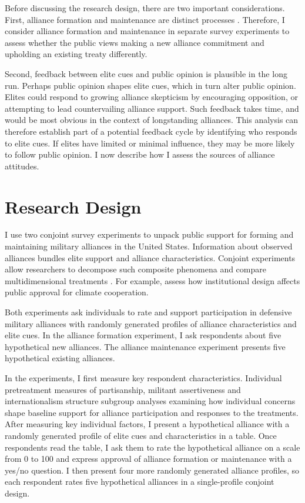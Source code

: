 \documentclass[12pt]{article}
\begin{document}
Before discussing the research design, there are two important considerations. 
First, alliance formation and maintenance are distinct processes \citep{Snyder1997}. 
Therefore, I consider alliance formation and maintenance in separate survey experiments to assess whether the public views making a new alliance commitment and upholding an existing treaty differently. 


Second, feedback between elite cues and public opinion is plausible in the long run. 
Perhaps public opinion shapes elite cues, which in turn alter public opinion. 
Elites could respond to growing alliance skepticism by encouraging opposition, or attempting to lead countervailing alliance support.
Such feedback takes time, and would be most obvious in the context of longstanding alliances.
This analysis can therefore establish part of a potential feedback cycle by identifying who responds to elite cues.  
If elites have limited or minimal influence, they may be more likely to follow public opinion.
I now describe how I assess the sources of alliance attitudes. 


\section{Research Design}


I use two conjoint survey experiments to unpack public support for forming and maintaining military alliances in the United States. 
Information about observed alliances bundles elite support and alliance characteristics. 
Conjoint experiments allow researchers to decompose such composite phenomena and compare multidimensional treatments \citep{Hainmuelleretal2014}. 
For example, \citet{BechtelScheve2013} assess how institutional design affects public approval for climate cooperation. 


Both experiments ask individuals to rate and support participation in defensive military alliances with randomly generated profiles of alliance characteristics and elite cues. 
In the alliance formation experiment, I ask respondents about five hypothetical new alliances. 
The alliance maintenance experiment presents five hypothetical existing alliances.


In the experiments, I first measure key respondent characteristics.  
Individual pretreatment measures of partisanship, militant assertiveness and internationalism structure subgroup analyses examining how individual concerns shape baseline support for alliance participation and responses to the treatments. 
After measuring key individual factors, I present a hypothetical alliance with a randomly generated profile of elite cues and characteristics in a table.
Once respondents read the table, I ask them to rate the hypothetical alliance on a scale from 0 to 100 and express approval of alliance formation or maintenance with a yes/no question. 
I then present four more randomly generated alliance profiles, so each respondent rates five hypothetical alliances in a single-profile conjoint design.
\end{document}
